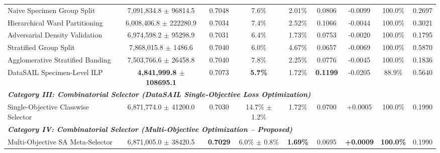 \documentclass[a4paper,fleqn]{cas-sc}
\begin{document}
\begin{table}[pos=htbp]
{\begin{tabular}{lcccccccc}
Naive Specimen Group Split & 7,091,834.8 $\pm$ 96814.5 & 0.7048 & 7.6\% & 2.01\% & 0.0806 & -0.0099 & 100.0\% & 0.2697 \\
Hierarchical Ward Partitioning & 6,008,406.8 $\pm$ 222280.9 & 0.7034 & 7.4\% & 2.52\% & 0.1066 & -0.0044 & 100.0\% & 0.3021 \\
Adversarial Density Validation & 6,974,598.2 $\pm$ 95298.9 & 0.7031 & 6.4\% & 1.73\% & 0.0753 & -0.0020 & 100.0\% & 0.1795 \\
Stratified Group Split & 7,868,015.8 $\pm$ 1486.6 & 0.7040 & 6.0\% & 4.67\% & 0.0657 & -0.0069 & 100.0\% & 0.5870 \\
Agglomerative Stratified Banding & 7,503,766.6 $\pm$ 26458.8 & 0.7040 & 7.8\% & 2.25\% & 0.0776 & -0.0045 & 100.0\% & 0.1836 \\
DataSAIL Specimen-Level ILP & \textbf{4,841,999.8 $\pm$ 108695.1} & 0.7073 & \textbf{5.7\%} & 1.72\% & \textbf{0.1199} & -0.0205 & 88.9\% & 0.5640 \\
\midrule
\multicolumn{9}{l}{\textit{\textbf{Category III: Combinatorial Selector (DataSAIL Single-Objective Loss Optimization)}}} \\
Single-Objective Classwise Selector & 6,871,774.0 $\pm$ 41200.0 & 0.7030 & 14.7\% $\pm$ 1.2\% & 1.72\% & 0.0700 & +0.0005 & 100.0\% & 0.1990 \\
\midrule
\multicolumn{9}{l}{\textit{\textbf{Category IV: Combinatorial Selector (Multi-Objective Optimization -- Proposed)}}} \\
Multi-Objective SA Meta-Selector & 6,871,005.0 $\pm$ 38420.5 & \textbf{0.7029} & 6.0\% $\pm$ 0.8\% & \textbf{1.69\%} & 0.0695 & \textbf{+0.0009} & \textbf{100.0\%} & 0.1990 \\
\bottomrule
\end{tabular}%
}
\end{table}
\end{document}
